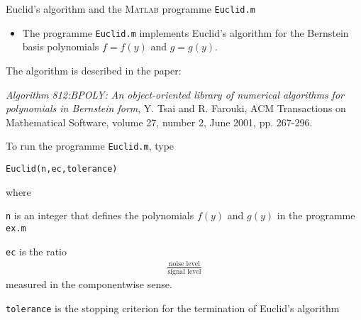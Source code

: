 \documentclass[a4paper,11pt]{article}
\begin{document}
%
\begin{center}
Euclid's algorithm and the \textsc{Matlab} programme \texttt{Euclid.m}
\end{center}
%
\date{}
%

\hrulefill


\vspace{0.5cm}

\begin{itemize}
\item{
The programme \texttt{Euclid.m} implements Euclid's algorithm for the
Bernstein basis polynomials $f=f(y)$ and $g=g(y)$.}
\end{itemize}

The algorithm is described in the paper:

\textit{Algorithm 812:BPOLY: An object-oriented library of numerical
algorithms for polynomials in Bernstein form}, Y. Tsai and R. Farouki, ACM Transactions on Mathematical Software,
volume 27, number 2, June 2001, pp. 267-296.
%



\vspace{0.5cm}

To run the programme \texttt{Euclid.m}, type
%
\begin{center}
\texttt{Euclid(n,ec,tolerance)}
\end{center}
%
where
%
\begin{description}
\item{\hspace{0.7cm} \texttt{n} is an integer that defines the polynomials $f(y)$ and $g(y)$ in the programme
\texttt{ex.m}}
%
\item{\hspace{0.7cm} \texttt{ec} is the ratio
%
\begin{eqnarray*}
\frac{\textrm{noise level}}{\textrm{signal level}}
\end{eqnarray*}
%
measured in the componentwise sense.}
%
\item{\hspace{0.7cm} \texttt{tolerance} is the stopping criterion for the termination of
Euclid's algorithm}
\end{description}
\end{document}
